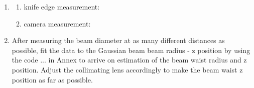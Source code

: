 \documentclass[12pt,A4Paper]{article}
\begin{document}
\begin{enumerate}
    \item 
    \begin{enumerate}
        \item knife edge measurement: %
        \item camera measurement: %
    \end{enumerate}

    \item After measuring the beam diameter at as many different distances as possible, fit the data to the Gaussian beam beam radius - z position by using the code ... in Annex to arrive on estimation of the beam waist radius and z position. Adjust the collimating lens accordingly to make the beam waist z position as far as possible. 
\end{enumerate}
\end{document}
